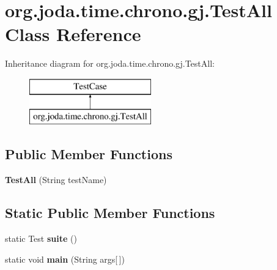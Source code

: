 \hypertarget{classorg_1_1joda_1_1time_1_1chrono_1_1gj_1_1_test_all}{\section{org.\-joda.\-time.\-chrono.\-gj.\-Test\-All Class Reference}
\label{classorg_1_1joda_1_1time_1_1chrono_1_1gj_1_1_test_all}
}
Inheritance diagram for org.\-joda.\-time.\-chrono.\-gj.\-Test\-All\-:\begin{figure}[H]
\begin{center}
\leavevmode
\includegraphics[height=2.000000cm]{classorg_1_1joda_1_1time_1_1chrono_1_1gj_1_1_test_all}
\end{center}
\end{figure}
\subsection*{Public Member Functions}
\begin{DoxyCompactItemize}
\item 
\hypertarget{classorg_1_1joda_1_1time_1_1chrono_1_1gj_1_1_test_all_adc79e082e5c80fcc44ca01601079a536}{{\bfseries Test\-All} (String test\-Name)}\label{classorg_1_1joda_1_1time_1_1chrono_1_1gj_1_1_test_all_adc79e082e5c80fcc44ca01601079a536}

\end{DoxyCompactItemize}
\subsection*{Static Public Member Functions}
\begin{DoxyCompactItemize}
\item 
\hypertarget{classorg_1_1joda_1_1time_1_1chrono_1_1gj_1_1_test_all_a0441f8754a57759ff1c126d67052823b}{static Test {\bfseries suite} ()}\label{classorg_1_1joda_1_1time_1_1chrono_1_1gj_1_1_test_all_a0441f8754a57759ff1c126d67052823b}

\item 
\hypertarget{classorg_1_1joda_1_1time_1_1chrono_1_1gj_1_1_test_all_af3175b696e3103f021e66c736937c94d}{static void {\bfseries main} (String args\mbox{[}$\,$\mbox{]})}\label{classorg_1_1joda_1_1time_1_1chrono_1_1gj_1_1_test_all_af3175b696e3103f021e66c736937c94d}

\end{DoxyCompactItemize}



